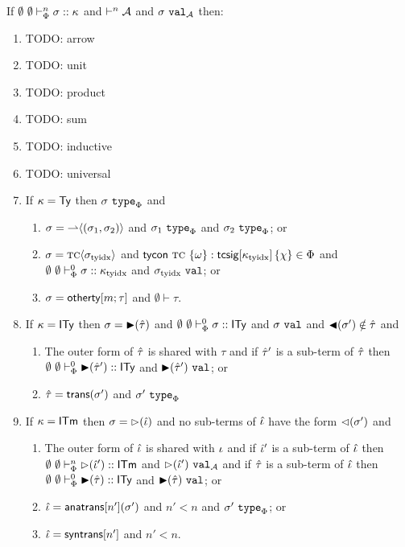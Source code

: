 \documentclass{llncs}
\begin{document}
\begin{theorem} If $\emptyset~\emptyset \vdash_{\Phi}^{n} \sigma :: \kappa$ and $\vdash^{n} \mathcal{A}$ and $\sigma~\mathtt{val}_{\mathcal{A}}$ then:
\begin{enumerate}
\item TODO: arrow
\item TODO: unit
\item TODO: product
\item TODO: sum
\item TODO: inductive
\item TODO: universal
\item If $\kappa = {\sf Ty}$ then $\sigma~\texttt{type}_{\Phi}$ and 
    \begin{enumerate}
    \item $\sigma = {\rightharpoonup}\langle(\sigma_1, \sigma_2)\rangle$ and $\sigma_1~\texttt{type}_{\Phi}$ and $\sigma_2~\texttt{type}_{\Phi}$; or
    \item $\sigma = {\textsc{tc}}\langle\sigma_\text{tyidx}\rangle$ and ${\sf tycon}~\textsc{tc} ~\{\omega\} : {\sf tcsig}[\kappa_\text{tyidx}]\,\{\chi\} \in \Phi$ and $\emptyset~\emptyset \vdash_{\Phi}^{0} \sigma :: \kappa_\text{tyidx}$ and $\sigma_\text{tyidx}~\mathtt{val}$; or
    \item $\sigma = {\sf otherty}[m; \tau]$ and $\emptyset \vdash \tau$.
    \end{enumerate}
\item If $\kappa = {\sf ITy}$ then $\sigma={\blacktriangleright}(\hat{\tau})$ and $\emptyset~\emptyset \vdash_{\Phi}^{0} \sigma :: {\sf ITy}$ and $\sigma~\mathtt{val}$ and ${\blacktriangleleft}(\sigma') \notin \hat{\tau}$ and 
    \begin{enumerate}
    \item The outer form of $\hat{\tau}$ is shared with $\tau$ and if $\hat{\tau}'$ is a sub-term of $\hat{\tau}$ then $\emptyset~\emptyset \vdash_{\Phi}^{0} {\blacktriangleright}(\hat{\tau}') :: {\sf ITy}$ and ${\blacktriangleright}(\hat{\tau}')~\mathtt{val}$; or
    \item $\hat{\tau} = {\sf trans}(\sigma')$ and $\sigma'~\texttt{type}_{\Phi}$
    \end{enumerate}
\item If $\kappa = {\sf ITm}$ then $\sigma={\rhd}(\hat{\iota})$ and no sub-terms of $\hat{\iota}$ have the form ${\lhd}(\sigma')$ and 
    \begin{enumerate}
    \item The outer form of $\hat{\iota}$ is shared with $\iota$ and if $\hat{\iota}'$ is a sub-term of $\hat{\iota}$ then $\emptyset~\emptyset \vdash_{\Phi}^{n} {\rhd}(\hat{\iota}') :: {\sf ITm}$ and ${\rhd}(\hat{\iota}')~\mathtt{val}_{\mathcal{A}}$ and if $\hat{\tau}$ is a sub-term of $\hat{\iota}$ then $\emptyset~\emptyset \vdash_{\Phi}^{0} {\blacktriangleright}(\hat{\tau}) :: {\sf ITy}$ and ${\blacktriangleright}(\hat{\tau})~\mathtt{val}$; or
    \item $\hat{\iota}={\sf anatrans}[n'](\sigma')$ and $n' < n$ and $\sigma'~\texttt{type}_{\Phi}$; or
    \item $\hat{\iota}={\sf syntrans}[n']$ and $n' < n$.
    \end{enumerate}
\end{enumerate}
\end{theorem}
\end{document}
